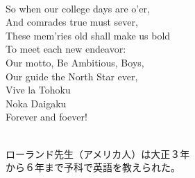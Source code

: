 \documentclass[10pt,b5j]{tarticle} %
\begin{document}
\begin{enumerate}
\begin{minipage}[c]{\blocksize}
        \vspace{\linespace}
        \item~\\
        So when our college days are o'er,\\
          And comrades true must sever,\\
        These mem'ries old shall make us bold\\
          To meet each new endeavor:\\
        Our motto, Be Ambitious, Boys,\\
          Our guide the North Star ever,\\
            Vive la Tohoku\\
            Noka Daigaku\\
        Forever and foever!
        
        
    \end{minipage}
    \begin{minipage}[c]{\blocksize}
        
        \vspace{\linespace}
        \item~\\
        ローランド先生（アメリカ人）は大正３年\\
        から６年まで予科で英語を教えられた。
    
    \end{minipage}
\end{enumerate} %
\end{document}
